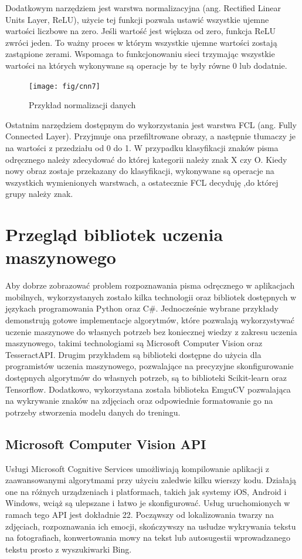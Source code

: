 \documentclass[brudnopis]{xmgr}
\begin{document}
Dodatkowym narzędziem jest warstwa normalizacyjna (ang. Rectified Linear Units Layer, ReLU), użycie tej funkcji pozwala ustawić wszystkie ujemne wartości liczbowe na zero. Jeśli wartość jest większa od zero, funkcja ReLU zwróci jeden. To ważny proces w którym wszystkie ujemne wartości zostają zastąpione zerami. Wspomaga to funkcjonowaniu sieci trzymając wszystkie wartości na których wykonywane są operacje by te były równe 0 lub dodatnie.

\begin{figure}[!tbh]
\centering
\texttt{[image: fig/cnn7]}
\caption{Przykład normalizacji danych}
\end{figure}
\newpage

Ostatnim narzędziem dostępnym do wykorzystania jest warstwa FCL (ang. Fully Connected Layer). Przyjmuje ona przefiltrowane obrazy, a następnie tłumaczy je na wartości z przedziału od 0 do 1. W przypadku klasyfikacji znaków pisma odręcznego należy zdecydować do której kategorii należy znak X czy O. Kiedy nowy obraz zostaje przekazany do klasyfikacji, wykonywane są operacje na wszystkich wymienionych warstwach, a ostatecznie FCL decyduję ,do której grupy należy znak.

\chapter{Przegląd bibliotek uczenia maszynowego}
Aby dobrze zobrazować problem rozpoznawania pisma odręcznego w aplikacjach mobilnych, wykorzystanych zostało kilka technologii oraz bibliotek dostępnych w językach programowania Python oraz C\#. Jednocześnie wybrane przykłady demonstrują gotowe implementacje algorytmów, które pozwalają wykorzystywać uczenie maszynowe do własnych potrzeb bez koniecznej wiedzy z zakresu uczenia maszynowego, takimi technologiami są Microsoft Computer Vision oraz TesseractAPI. Drugim przykładem są biblioteki dostępne do użycia dla programistów uczenia maszynowego, pozwalające na precyzyjne skonfigurowanie dostępnych algorytmów do własnych potrzeb, są to biblioteki Scikit-learn oraz Tensorflow. Dodatkowo, wykorzystana została biblioteka EmguCV pozwalająca na wykrywanie znaków na zdjęciach oraz odpowiednie formatowanie go na potrzeby stworzenia modelu danych do treningu.

\section{Microsoft Computer Vision API}

Usługi Microsoft Cognitive Services umożliwiają kompilowanie aplikacji z zaawansowanymi algorytmami przy użyciu zaledwie kilku wierszy kodu. Działają one na różnych urządzeniach i platformach, takich jak systemy iOS, Android i Windows, wciąż są ulepszane i łatwo je skonfigurować. Usług uruchomionych w ramach tego API jest dokładnie 22. Począwszy od lokalizowania twarzy na zdjęciach, rozpoznawania ich emocji, skończywszy na usłudze wykrywania tekstu na fotografiach, konwertowania mowy na tekst lub autosugestii wprowadzanego tekstu prosto z wyszukiwarki Bing.
\end{document}
